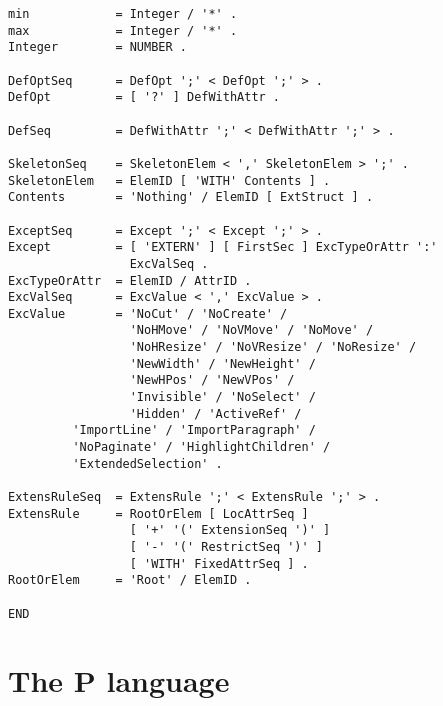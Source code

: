 \begin{verbatim}
min            = Integer / '*' .
max            = Integer / '*' .
Integer        = NUMBER .

DefOptSeq      = DefOpt ';' < DefOpt ';' > .
DefOpt         = [ '?' ] DefWithAttr .

DefSeq         = DefWithAttr ';' < DefWithAttr ';' > .

SkeletonSeq    = SkeletonElem < ',' SkeletonElem > ';' .
SkeletonElem   = ElemID [ 'WITH' Contents ] .
Contents       = 'Nothing' / ElemID [ ExtStruct ] .

ExceptSeq      = Except ';' < Except ';' > .
Except         = [ 'EXTERN' ] [ FirstSec ] ExcTypeOrAttr ':'
                 ExcValSeq .
ExcTypeOrAttr  = ElemID / AttrID .
ExcValSeq      = ExcValue < ',' ExcValue > .
ExcValue       = 'NoCut' / 'NoCreate' /
                 'NoHMove' / 'NoVMove' / 'NoMove' /
                 'NoHResize' / 'NoVResize' / 'NoResize' /
                 'NewWidth' / 'NewHeight' /
                 'NewHPos' / 'NewVPos' /
                 'Invisible' / 'NoSelect' /
                 'Hidden' / 'ActiveRef' /
		 'ImportLine' / 'ImportParagraph' /
		 'NoPaginate' / 'HighlightChildren' /
		 'ExtendedSelection' .

ExtensRuleSeq  = ExtensRule ';' < ExtensRule ';' > .
ExtensRule     = RootOrElem [ LocAttrSeq ]
                 [ '+' '(' ExtensionSeq ')' ]
                 [ '-' '(' RestrictSeq ')' ]
                 [ 'WITH' FixedAttrSeq ] .
RootOrElem     = 'Root' / ElemID .

END
\end{verbatim}

\section{The P language}

